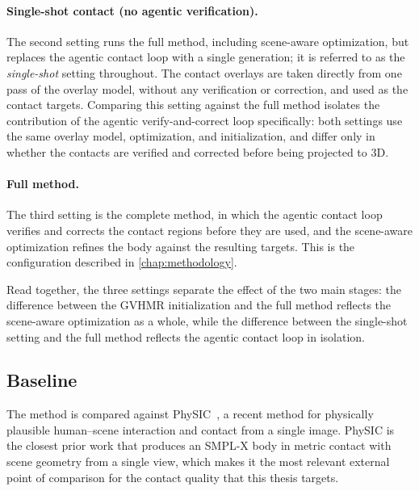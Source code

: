 \paragraph{Single-shot contact (no agentic verification).} The second setting runs the full method, including scene-aware optimization, but replaces the agentic contact loop with a single generation; it is referred to as the \emph{single-shot} setting throughout. The contact overlays are taken directly from one pass of the overlay model, without any verification or correction, and used as the contact targets. Comparing this setting against the full method isolates the contribution of the agentic verify-and-correct loop specifically: both settings use the same overlay model, optimization, and initialization, and differ only in whether the contacts are verified and corrected before being projected to 3D.

\paragraph{Full method.} The third setting is the complete method, in which the agentic contact loop verifies and corrects the contact regions before they are used, and the scene-aware optimization refines the body against the resulting targets. This is the configuration described in \cref{chap:methodology}.

Read together, the three settings separate the effect of the two main stages: the difference between the GVHMR initialization and the full method reflects the scene-aware optimization as a whole, while the difference between the single-shot setting and the full method reflects the agentic contact loop in isolation.

\subsection{Baseline}
\label{sec:exp-baseline}

The method is compared against PhySIC~\cite{muralidhar2025physic}, a recent method for physically plausible human--scene interaction and contact from a single image. PhySIC is the closest prior work that produces an SMPL-X body in metric contact with scene geometry from a single view, which makes it the most relevant external point of comparison for the contact quality that this thesis targets.

